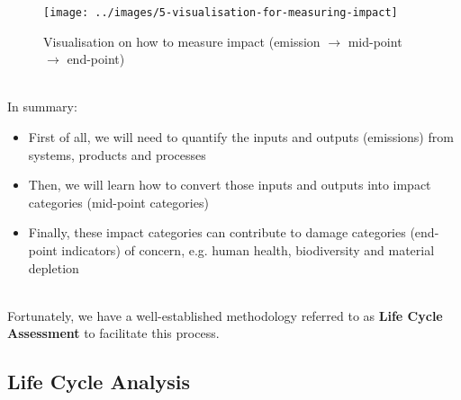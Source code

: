 \documentclass[../summary.tex]{subfiles}
\begin{document}
\begin{figure}[H]
	\centering
	\texttt{[image: ../images/5-visualisation-for-measuring-impact]}
	\caption{Visualisation on how to measure impact (emission $\rightarrow$ mid-point $\rightarrow$ end-point)}
	\label{fig:visualisation-for-measuring-impact}
\end{figure}
\ \\
In summary:
\begin{itemize}
	\item First of all, we will need to quantify the inputs and outputs (emissions) from systems, products and processes
	\item Then, we will learn how to convert those inputs and outputs into impact categories (mid-point categories)
	\item Finally, these impact categories can contribute to damage categories (end-point indicators) of concern, e.g. human health, biodiversity and material depletion
\end{itemize}
\ \\
Fortunately, we have a well-established methodology referred to as \textbf{Life Cycle Assessment} to facilitate this process.

\subsection{Life Cycle Analysis}
\end{document}
